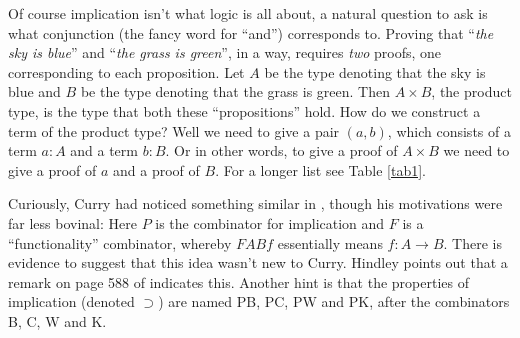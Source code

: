 Of course implication isn't what logic is all about, a natural question to ask is what conjunction (the fancy word for ``and'') corresponds to. Proving that ``\emph{the sky is blue}'' and ``\emph{the grass is green}'', in a way, requires \emph{two} proofs, one corresponding to each proposition. Let $A$ be the type denoting that the sky is blue and $B$ be the type denoting that the grass is green. Then $A \times B$, the product type, is the type that both these ``propositions'' hold. How do we construct a term of the product type? Well we need to give a pair $(a, b)$, which consists of a term $a : A$ and a term $b : B$. Or in other words, to give a proof of $A \times B$ we need to give a proof of $a$ and a proof of $B$. For a longer list see Table \ref{tab1}.

Curiously, Curry had noticed something similar in \cite[footnote 28]{10.2307/2266302}, though his motivations were far less bovinal: 
Here $P$ is the combinator for implication and $F$ is a ``functionality'' combinator, whereby $F A B f$ essentially means $f : A \to B$.
There is evidence to suggest that this idea wasn't new to Curry. Hindley \cite{hindley_1997} points out that a remark on page 588 of \cite{10.2307/86796} indicates this. Another hint is that the properties of implication (denoted $\supset$) are named PB, PC, PW and PK, after the combinators B, C, W and K.

